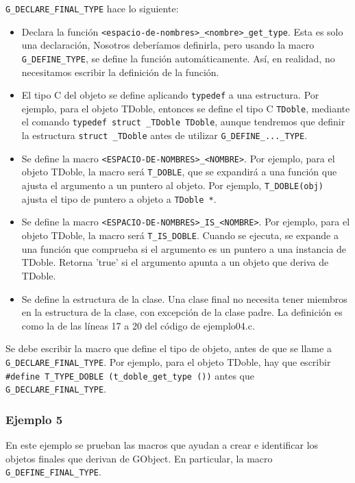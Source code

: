 \texttt{G\_DECLARE\_FINAL\_TYPE} hace lo siguiente:
\begin{itemize}
  \tightlist
\item Declara la función \texttt{<espacio-de-nombres>\_<nombre>\_get\_type}. Esta es solo una declaración,
  Nosotros deberíamos definirla, pero usando la macro \texttt{G\_DEFINE\_TYPE}, se define la función
  automáticamente. Así, en realidad, no necesitamos escribir la definición de la función.
\item El tipo C del objeto se define aplicando \texttt{typedef} a una estructura. Por ejemplo, para el objeto
  \textsf{TDoble}, entonces se define el tipo C \texttt{TDoble}, mediante el comando
  \texttt{typedef struct \_TDoble TDoble}, aunque tendremos que definir la estructura \texttt{struct \_TDoble}
  antes de utilizar \texttt{G\_DEFINE\_...\_TYPE}.
\item Se define la macro \texttt{<ESPACIO-DE-NOMBRES>\_<NOMBRE>}. Por ejemplo, para el objeto
  \textsf{TDoble}, la macro será \texttt{T\_DOBLE}, que se expandirá a una función que ajusta el argumento
  a un puntero al objeto. Por ejemplo, \texttt{T\_DOBLE(obj)} ajusta el tipo de puntero a objeto a
  \texttt{TDoble *}.
\item Se define la macro \texttt{<ESPACIO-DE-NOMBRES>\_IS\_<NOMBRE>}. Por ejemplo, para el objeto
  \textsf{TDoble}, la macro será \texttt{T\_IS\_DOBLE}. Cuando se ejecuta, se expande a una función que
  comprueba si el argumento es un puntero a una instancia de \textsf{TDoble}. Retorna 'true' si el argumento
  apunta a un objeto que deriva de \textsf{TDoble}.
\item Se define la estructura de la clase. Una clase final no necesita tener miembros en la estructura de la clase,
  con excepción de la clase padre. La definición es como la de las líneas 17 a 20 del código de  ejemplo04.c.
\end{itemize}

Se debe escribir la macro que define el tipo de objeto, antes de que se llame a
\texttt{G\_DECLARE\_FINAL\_TYPE}. Por ejemplo, para el objeto \textsf{TDoble}, hay que escribir
\texttt{\#define T\_TYPE\_DOBLE (t\_doble\_get\_type ())} antes que \texttt{G\_DECLARE\_FINAL\_TYPE}.

\subsubsection{Ejemplo 5}
En este ejemplo se prueban las macros que ayudan a crear e identificar los objetos finales que derivan
de \textsf{GObject}. En particular, la macro \texttt{G\_DEFINE\_FINAL\_TYPE}.

